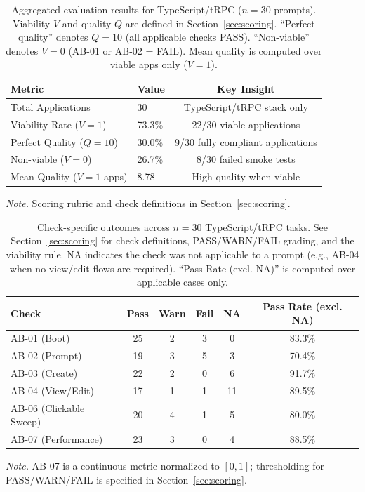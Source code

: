 \documentclass{article}
\begin{document}
\begin{table}[t]
\caption{Aggregated evaluation results for TypeScript/tRPC ($n=30$ prompts). Viability $V$ and quality $Q$ are defined in Section~\ref{sec:scoring}. ``Perfect quality'' denotes $Q=10$ (all applicable checks PASS). ``Non-viable'' denotes $V=0$ (AB-01 or AB-02 = FAIL). Mean quality is computed over viable apps only ($V=1$).}
\label{tab:aggregated-results}
\centering
\begin{threeparttable}
\begin{tabular}{llc}
\toprule
Metric & Value & Key Insight \\
\midrule
Total Applications & 30 & TypeScript/tRPC stack only \\
Viability Rate ($V=1$) & 73.3\% & 22/30 viable applications \\
Perfect Quality ($Q=10$) & 30.0\% & 9/30 fully compliant applications \\
Non-viable ($V=0$) & 26.7\% & 8/30 failed smoke tests \\
Mean Quality ($V=1$ apps) & 8.78 & High quality when viable \\
\bottomrule
\end{tabular}
\begin{tablenotes}
\item \textit{Note.} Scoring rubric and check definitions in Section~\ref{sec:scoring}.
\end{tablenotes}
\end{threeparttable}
\end{table}

\begin{table}[t]
\caption{Check-specific outcomes across $n=30$ TypeScript/tRPC tasks. See Section~\ref{sec:scoring} for check definitions, PASS/WARN/FAIL grading, and the viability rule. NA indicates the check was not applicable to a prompt (e.g., AB-04 when no view/edit flows are required). ``Pass Rate (excl. NA)'' is computed over applicable cases only.}
\label{tab:check-pass-rates}
\centering
\begin{threeparttable}
\begin{tabular}{lccccc}
\toprule
Check & Pass & Warn & Fail & NA & Pass Rate (excl. NA) \\
\midrule
AB-01 (Boot) & 25 & 2 & 3 & 0 & 83.3\% \\
AB-02 (Prompt) & 19 & 3 & 5 & 3 & 70.4\% \\
AB-03 (Create) & 22 & 2 & 0 & 6 & 91.7\% \\
AB-04 (View/Edit) & 17 & 1 & 1 & 11 & 89.5\% \\
AB-06 (Clickable Sweep) & 20 & 4 & 1 & 5 & 80.0\% \\
AB-07 (Performance) & 23 & 3 & 0 & 4 & 88.5\% \\
\bottomrule
\end{tabular}
\begin{tablenotes}
\item \textit{Note.} AB-07 is a continuous metric normalized to $[0,1]$; thresholding for PASS/WARN/FAIL is specified in Section~\ref{sec:scoring}.
\end{tablenotes}
\end{threeparttable}
\end{table}
\end{document}
